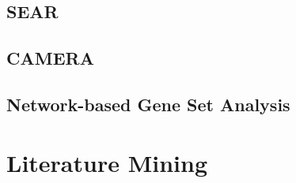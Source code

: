 \documentclass[]{book}
\begin{document}
\section{SEAR}\label{sear}

\section{CAMERA}\label{camera}

\section{Network-based Gene Set
Analysis}\label{network-based-gene-set-analysis}

\chapter{Literature Mining}\label{lit}


\end{document}
